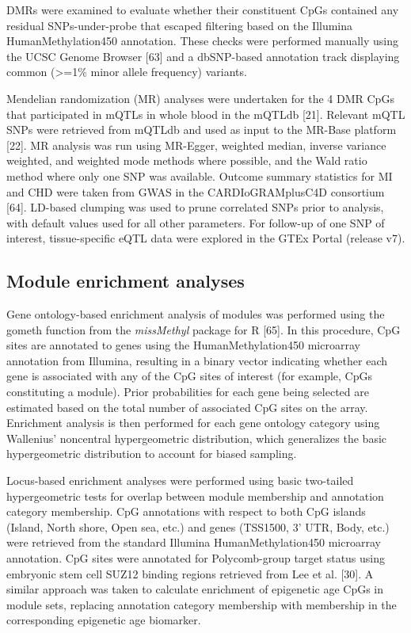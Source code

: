 \documentclass[]{bmcart}
\begin{document}
DMRs were examined to evaluate whether their constituent CpGs contained
any residual SNPs-under-probe that escaped filtering based on the
Illumina HumanMethylation450 annotation. These checks were performed
manually using the UCSC Genome Browser {[}63{]} and a dbSNP-based
annotation track displaying common (\textgreater{}=1\% minor allele
frequency) variants.

Mendelian randomization (MR) analyses were undertaken for the 4 DMR CpGs
that participated in mQTLs in whole blood in the mQTLdb {[}21{]}.
Relevant mQTL SNPs were retrieved from mQTLdb and used as input to the
MR-Base platform {[}22{]}. MR analysis was run using MR-Egger, weighted
median, inverse variance weighted, and weighted mode methods where
possible, and the Wald ratio method where only one SNP was available.
Outcome summary statistics for MI and CHD were taken from GWAS in the
CARDIoGRAMplusC4D consortium {[}64{]}. LD-based clumping was used to
prune correlated SNPs prior to analysis, with default values used for
all other parameters. For follow-up of one SNP of interest,
tissue-specific eQTL data were explored in the GTEx Portal (release v7).

\subsection{Module enrichment
analyses}\label{module-enrichment-analyses}

Gene ontology-based enrichment analysis of modules was performed using
the gometh function from the \emph{missMethyl} package for R {[}65{]}.
In this procedure, CpG sites are annotated to genes using the
HumanMethylation450 microarray annotation from Illumina, resulting in a
binary vector indicating whether each gene is associated with any of the
CpG sites of interest (for example, CpGs constituting a module). Prior
probabilities for each gene being selected are estimated based on the
total number of associated CpG sites on the array. Enrichment analysis
is then performed for each gene ontology category using Wallenius'
noncentral hypergeometric distribution, which generalizes the basic
hypergeometric distribution to account for biased sampling.

Locus-based enrichment analyses were performed using basic two-tailed
hypergeometric tests for overlap between module membership and
annotation category membership. CpG annotations with respect to both CpG
islands (Island, North shore, Open sea, etc.) and genes (TSS1500, 3'
UTR, Body, etc.) were retrieved from the standard Illumina
HumanMethylation450 microarray annotation. CpG sites were annotated for
Polycomb-group target status using embryonic stem cell SUZ12 binding
regions retrieved from Lee et al. {[}30{]}. A similar approach was taken
to calculate enrichment of epigenetic age CpGs in module sets, replacing
annotation category membership with membership in the corresponding
epigenetic age biomarker.
\end{document}
